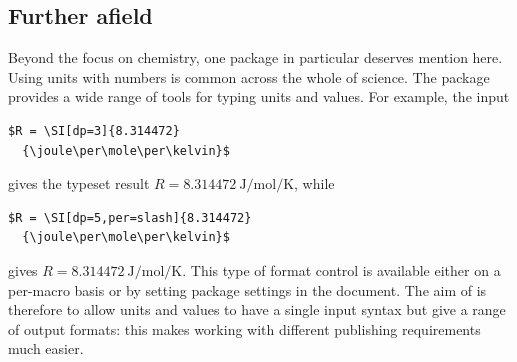 \begin{bibunit}
\subsection{Further afield}

Beyond the focus on chemistry, one package in particular
deserves mention here.  Using units with numbers is common
across the whole of science.  The  package
provides a wide range of tools for typing units and values. For
example, the input
\begin{verbatim}
$R = \SI[dp=3]{8.314472}
  {\joule\per\mole\per\kelvin}$
\end{verbatim}
gives the typeset result $R = \SI [dp=3] {8.314472}
{\joule\per\mole\per\kelvin}$, while
\begin{verbatim}
$R = \SI[dp=5,per=slash]{8.314472}
  {\joule\per\mole\per\kelvin}$
\end{verbatim}
gives $R = \SI [dp=5,per=slash] {8.314472}
{\joule\per\mole\per\kelvin}$.  This type of format control is
available either on a per-macro basis or by setting package
settings in the document.  The aim of  is
therefore to allow units and values to have a single input
syntax but give a range of output formats: this makes working
with different publishing requirements much easier.

\end{bibunit}

% 
% 
